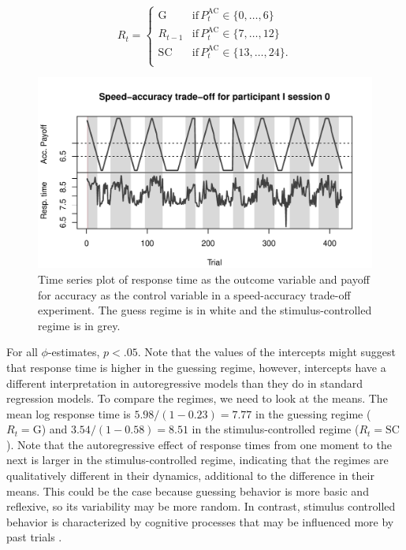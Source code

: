 \documentclass{article}
\begin{document}
\begin{equation} 
R_t = \begin{cases}
\mathrm{G} & \mathrm{if} \, P^{\mathrm{AC}}_{t} \in \{0, \dots, 6\} \\
R_{t-1} & \mathrm{if} \, P^{\mathrm{AC}}_{t} \in \{7, \dots, 12\} \\
\mathrm{SC} & \mathrm{if} \, P^{\mathrm{AC}}_{t} \in \{13, \dots, 24\}. \\
\end{cases}
\end{equation}

\begin{figure}
\begin{center}
\includegraphics[scale=.7]{SAT_plot_I0}
\caption{Time series plot of response time as the outcome variable and payoff for accuracy as the control variable in a speed-accuracy trade-off experiment. The guess regime is in white and the stimulus-controlled regime is in grey.}
\label{fig:ts_plot_SAT}
\end{center}
\end{figure}

For all $\phi$-estimates, $p < .05$.
Note that the values of the intercepts might suggest that response time is higher in the guessing regime, however, intercepts have a different interpretation in autoregressive models than they do in standard regression models.
To compare the regimes, we need to look at the means.
The mean log response time is $5.98/(1 - 0.23) = 7.77$ in the guessing regime ($R_t = \mathrm{G}$) and $3.54/(1 - 0.58) = 8.51$ in the stimulus-controlled regime ($R_t = \mathrm{SC}$). 
Note that the autoregressive effect of response times from one moment to the next is larger in the stimulus-controlled regime, indicating that the regimes are qualitatively different in their dynamics, additional to the difference in their means. This could be the case because guessing behavior is more basic and reflexive, so its variability may be more random. In contrast, stimulus controlled behavior is characterized by cognitive processes that may be influenced more by past trials \citep{RT_autocorrelation}.
\end{document}
